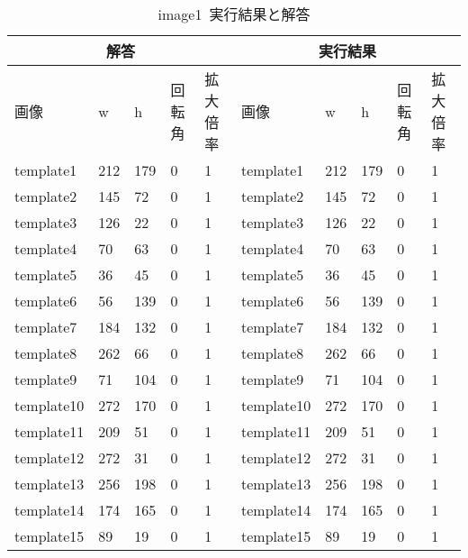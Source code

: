 \begin{table}[]
\centering
\caption{image1~実行結果と解答}
\label{my-label1}
\begin{tabular}{|l|l|l|l|l||l|l|l|l|l|}
\hline
\multicolumn{5}{|c||}{解答}          & \multicolumn{5}{c|}{実行結果}             \\ \hline
画像         & w   & h   & 回転角 & 拡大倍率 & 画像         & w   & h   & 回転角 & 拡大倍率 \\ \hline
template1  & 212 & 179 & 0   & 1    & template1  & 212 & 179 & 0   & 1    \\ \hline
template2  & 145 & 72  & 0   & 1    & template2  & 145 & 72  & 0   & 1    \\ \hline
template3  & 126 & 22  & 0   & 1    & template3  & 126 & 22  & 0   & 1    \\ \hline
template4  & 70  & 63  & 0   & 1    & template4  & 70  & 63  & 0   & 1    \\ \hline
template5  & 36  & 45  & 0   & 1    & template5  & 36  & 45  & 0   & 1    \\ \hline
template6  & 56  & 139 & 0   & 1    & template6  & 56  & 139 & 0   & 1    \\ \hline
template7  & 184 & 132 & 0   & 1    & template7  & 184 & 132 & 0   & 1    \\ \hline
template8  & 262 & 66  & 0   & 1    & template8  & 262 & 66  & 0   & 1    \\ \hline
template9  & 71  & 104 & 0   & 1    & template9  & 71  & 104 & 0   & 1    \\ \hline
template10 & 272 & 170 & 0   & 1    & template10 & 272 & 170 & 0   & 1    \\ \hline
template11 & 209 & 51  & 0   & 1    & template11 & 209 & 51  & 0   & 1    \\ \hline
template12 & 272 & 31  & 0   & 1    & template12 & 272 & 31  & 0   & 1    \\ \hline
template13 & 256 & 198 & 0   & 1    & template13 & 256 & 198 & 0   & 1    \\ \hline
template14 & 174 & 165 & 0   & 1    & template14 & 174 & 165 & 0   & 1    \\ \hline
template15 & 89  & 19  & 0   & 1    & template15 & 89  & 19  & 0   & 1    \\ \hline
\end{tabular}
\end{table}